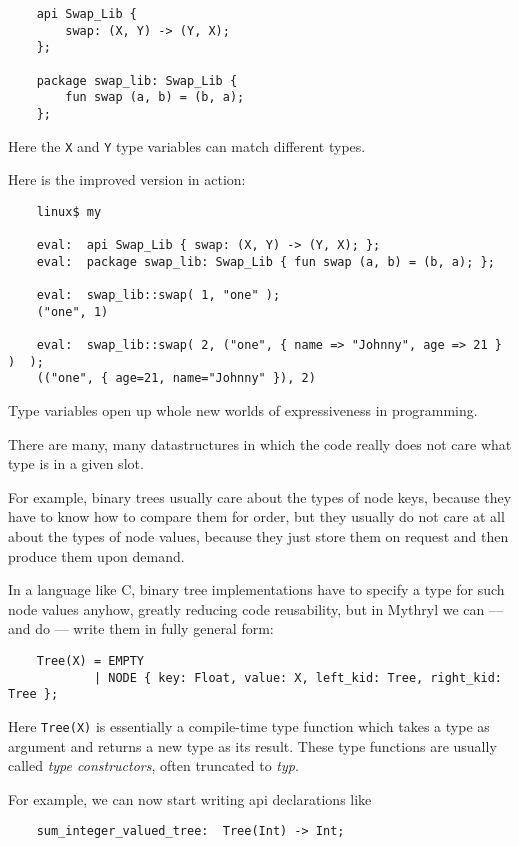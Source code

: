 \begin{verbatim}
    api Swap_Lib { 
        swap: (X, Y) -> (Y, X);
    };

    package swap_lib: Swap_Lib {
        fun swap (a, b) = (b, a);
    };
\end{verbatim}

Here the {\tt X} and {\tt Y} type variables can match different types.

Here is the improved version in action:

\begin{verbatim}
    linux$ my

    eval:  api Swap_Lib { swap: (X, Y) -> (Y, X); };
    eval:  package swap_lib: Swap_Lib { fun swap (a, b) = (b, a); };

    eval:  swap_lib::swap( 1, "one" );
    ("one", 1)

    eval:  swap_lib::swap( 2, ("one", { name => "Johnny", age => 21 } )  );
    (("one", { age=21, name="Johnny" }), 2)
\end{verbatim}

Type variables open up whole new worlds of expressiveness in programming.

There are many, many datastructures in which the code really does not 
care what type is in a given slot.

For example, binary trees usually 
care about the types of node keys, because they have to know how to compare 
them for order, but they usually do not care at all about the types of 
node values, because they just store them on request and then produce them 
upon demand.

In a language like C, binary tree implementations have to specify a 
type for such node values anyhow, greatly reducing code reusability, 
but in Mythryl we can --- and do --- write them in fully general form:

\begin{verbatim}
    Tree(X) = EMPTY
            | NODE { key: Float, value: X, left_kid: Tree, right_kid: Tree };
\end{verbatim}

Here {\tt Tree(X)} is essentially a compile-time type function which 
takes a type as argument and returns a new type as its result.  These 
type functions are usually called {\it type constructors}, often truncated to {\it typ}.

For example, we can now start writing api declarations like

\begin{verbatim}
    sum_integer_valued_tree:  Tree(Int) -> Int;
\end{verbatim}

